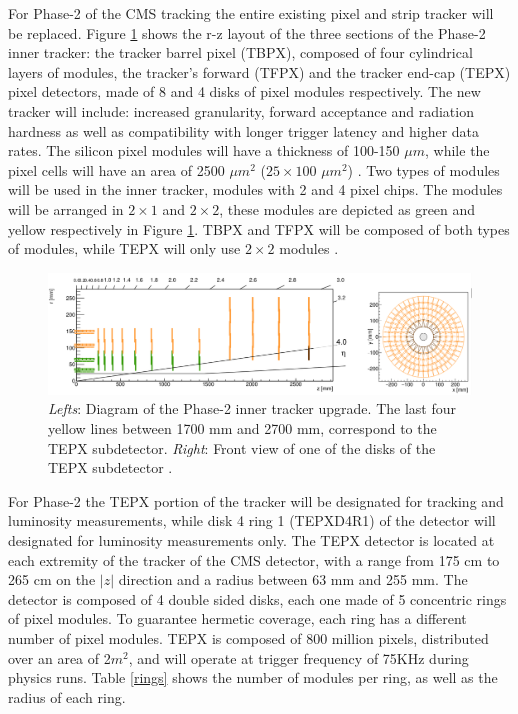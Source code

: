 For Phase-2 of the CMS tracking the entire existing pixel and strip tracker will be replaced. Figure \ref{TEPXl} shows the r-z layout of the three sections of the Phase-2 inner tracker: the  tracker barrel pixel (TBPX), composed of four cylindrical layers of modules, the tracker’s forward (TFPX) and the tracker end-cap (TEPX) pixel detectors, made of 8 and 4 disks of pixel modules respectively. The new tracker will include: increased granularity, forward acceptance and radiation hardness as well as compatibility with longer trigger latency and higher data rates.
The silicon pixel modules will have a thickness of 100-150 $\mu m$, while the pixel cells will have an area of 2500 $\mu m^2$ ($25\times 100$ $\mu m^2$) \cite{CERN-LHCC-2017-009}\cite{DelBurgo:2706637}. Two types of modules will be used in the inner tracker, modules with 2 and 4 pixel chips. The modules will be arranged in $2\times1$ and $2\times 2$, these modules are depicted as green and yellow respectively in  Figure \ref{TEPXl}. TBPX and TFPX will be composed of both types of modules, while TEPX will only use $2\times 2$ modules \cite{DelBurgo:2706637}. 
\begin{center}
\begin{figure}[H]
    \centering
    \includegraphics[scale=.2]{Chapter2/TEPX.png}
    \caption[Diagram of the Phase-2 inner tracker upgrade.]{\textit{Lefts}: Diagram of the Phase-2 inner tracker upgrade. The last four yellow lines between 1700 mm and 2700 mm, correspond to the TEPX subdetector. \textit{Right}:  Front view of one of the disks of the TEPX subdetector \cite{DelBurgo:2706637}.}
    \label{TEPXl}
\end{figure}
\end{center}
For Phase-2 the TEPX portion of the tracker will be designated for tracking and luminosity measurements, while disk 4 ring 1 (TEPXD4R1) of the detector will designated for luminosity measurements only. The TEPX detector is located at each extremity of the tracker of the CMS detector, with a range  from 175 cm to 265 cm on the $|z|$ direction and a radius  between 63 mm and 255 mm. The detector is composed of 4 double sided disks, each one made of 5 concentric rings of pixel modules. To guarantee hermetic coverage, each ring has a different number of pixel modules. TEPX is composed of 800 million pixels, distributed over an area of 2$m^2$, and will operate at trigger frequency of 75KHz during physics runs. Table \ref{rings} shows the number of modules per ring, as well as the radius of each ring.

